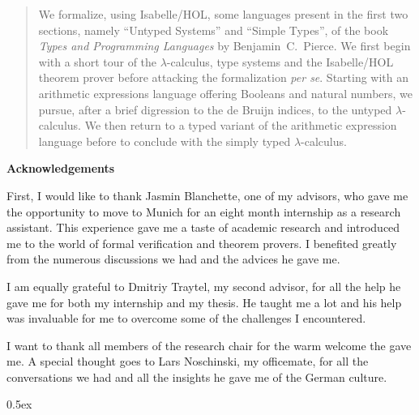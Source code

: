 \documentclass[12pt,a4paper,titlepage,oneside]{article}
\makeatletter
\newcommand\ackname{Acknowledgements}
\newenvironment{acknowledgements}{%
      \titlepage
      \null\vfil
      \@beginparpenalty\@lowpenalty
      \begin{center}%
        \bfseries \ackname
        \@endparpenalty\@M
      \end{center}}%
     {\par\vfil\null\endtitlepage}
\newenvironment{acknowledgements}{%
      \if@twocolumn
        \section*{\abstractname}%
      \else
        \small
        \begin{center}%
          {\bfseries \ackname\vspace{-.5em}\vspace{\z@}}%
        \end{center}%
        \quotation
      \fi}
      {\if@twocolumn\else\endquotation\fi}
\makeatother
\begin{document}
\begin{abstract}
We formalize, using Isabelle/HOL, some languages present in the first two sections, namely ``Untyped
Systems'' and ``Simple Types'', of the book \emph{Types and Programming Languages} by
Benjamin~C.~Pierce. We first begin with a short tour of the $\lambda$-calculus, type systems and the
Isabelle/HOL theorem prover before attacking the formalization \emph{per se}. Starting with an
arithmetic expressions language offering Booleans and natural numbers, we pursue, after a brief
digression to the de Bruijn indices, to the untyped $\lambda$-calculus. We then return to a typed
variant of the arithmetic expression language before to conclude with the simply typed
$\lambda$-calculus.
\end{abstract}

\newpage
\null
\newpage

\begin{acknowledgements}
  First, I would like to thank Jasmin Blanchette, one of my advisors, who gave me the opportunity to
  move to Munich for an eight month internship as a research assistant. This experience gave me a
  taste of academic research and introduced me to the world of formal verification and theorem
  provers. I benefited greatly from the numerous discussions we had and the advices he gave me.

  I am equally grateful to Dmitriy Traytel, my second advisor, for all the help he gave me for
  both my internship and my thesis. He taught me a lot and his help was invaluable for me to
  overcome some of the challenges I encountered.

  I want to thank all members of the research chair for the warm welcome the gave me. A special
  thought goes to Lars Noschinski, my officemate, for all the conversations we had and all the
  insights he gave me of the German culture.
\end{acknowledgements}

\newpage
\null
\newpage

\tableofcontents

\newpage
\null
\newpage

\pagestyle{headings}





\parindent 0pt\parskip 0.5ex









\newpage

\nocite{*}



%
%
\end{document}
